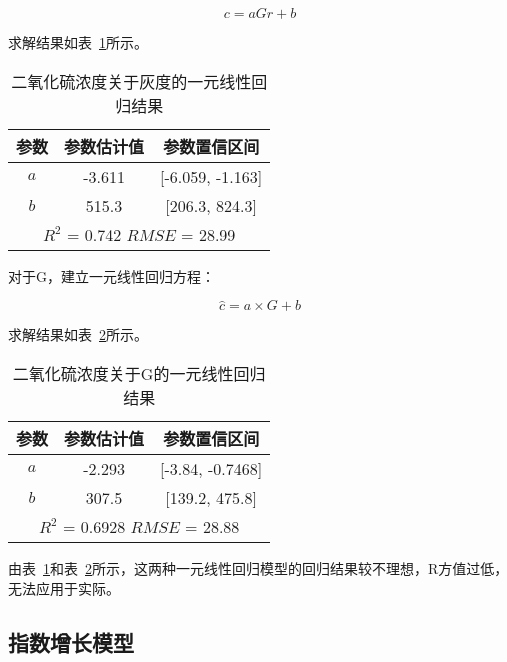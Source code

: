 $$c=a Gr+b$$

求解结果如表~\ref{SO2_Gr_linear}所示。

\begin{table}[]
    \centering
    \caption{二氧化硫浓度关于灰度的一元线性回归结果}
    \label{SO2_Gr_linear}
    \begin{tabular}{@{}ccc@{}}
    \toprule
    参数       & 参数估计值      & 参数置信区间                   \\ \midrule
    $a$      & -3.611     & {[}-6.059, -1.163{]}     \\
    $b$      & 515.3      & {[}206.3, 824.3{]}       \\ \midrule
    \multicolumn{3}{c}{$R^2$ = 0.742 $RMSE$ = 28.99} \\ \bottomrule
    \end{tabular}
    \end{table}


对于G，建立一元线性回归方程：

$$\hat{c}=a \times G+b$$

求解结果如表~\ref{SO2_G_linear}所示。

\begin{table}[]
    \centering
    \caption{二氧化硫浓度关于G的一元线性回归结果}
    \label{SO2_G_linear}
    \begin{tabular}{@{}ccc@{}}
    \toprule
    参数       & 参数估计值      & 参数置信区间                   \\ \midrule
    $a$      & -2.293     & {[}-3.84, -0.7468{]}     \\



    
    $b$      & 307.5      & {[}139.2, 475.8{]}       \\ \midrule
    \multicolumn{3}{c}{$R^2$ = 0.6928 $RMSE$ = 28.88} \\ \bottomrule
    \end{tabular}
\end{table}


由表~\ref{SO2_Gr_linear}和表~\ref{SO2_G_linear}所示，这两种一元线性回归模型的回归结果较不理想，R方值过低，无法应用于实际。

\subsection{指数增长模型}

